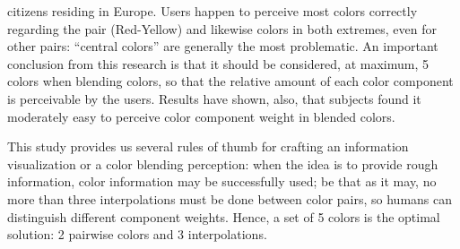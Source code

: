 citizens residing in Europe. Users happen to perceive most colors correctly regarding the pair (Red-Yellow)
and likewise colors in both extremes, even for other pairs: “central colors” are generally the most
problematic. An important conclusion from this research is that it should be considered, at maximum, 5
colors when blending colors, so that the relative amount of each color component is perceivable by the
users. Results have shown, also, that subjects found it moderately easy to perceive color component
weight in blended colors. \par
%
This study provides us several rules of thumb for crafting an information visualization or a color
blending perception: when the idea is to provide rough information, color information may be successfully
used; be that as it may, no more than three interpolations must be done between color pairs, so humans
can distinguish different component weights. Hence, a set of 5 colors is the optimal solution: 2
pairwise colors and 3 interpolations. \par
%
